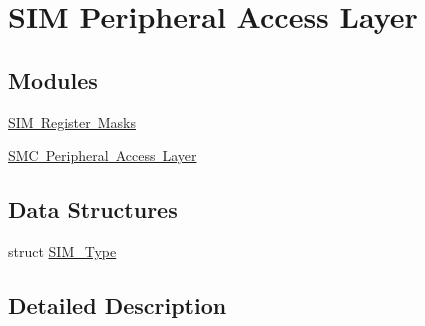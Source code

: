 \hypertarget{group___s_i_m___peripheral___access___layer}{}\section{S\+IM Peripheral Access Layer}
\label{group___s_i_m___peripheral___access___layer}
\subsection*{Modules}
\begin{DoxyCompactItemize}
\item 
\mbox{\hyperlink{group___s_i_m___register___masks}{S\+I\+M Register Masks}}
\item 
\mbox{\hyperlink{group___s_m_c___peripheral___access___layer}{S\+M\+C Peripheral Access Layer}}
\end{DoxyCompactItemize}
\subsection*{Data Structures}
\begin{DoxyCompactItemize}
\item 
struct \mbox{\hyperlink{struct_s_i_m___type}{S\+I\+M\+\_\+\+Type}}
\end{DoxyCompactItemize}


\subsection{Detailed Description}
